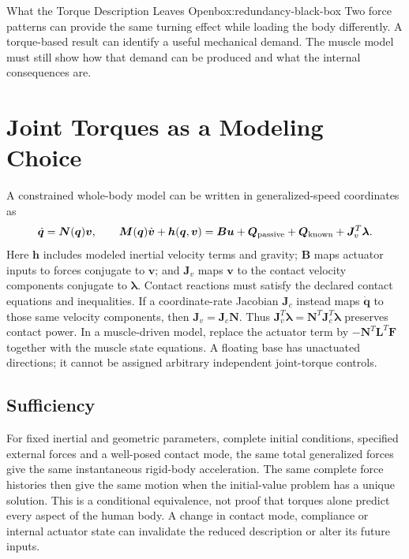 \begin{laymansbox}{What the Torque Description Leaves Open}{box:redundancy-black-box}
Two force patterns can provide the same turning effect while loading the body differently. A torque-based result can identify a useful mechanical demand. The muscle model must still show how that demand can be produced and what the internal consequences are.
\end{laymansbox}

\section{Joint Torques as a Modeling Choice}
\label{sec:why-joint-torques}

A constrained whole-body model can be written in generalized-speed coordinates as
\[
\dot{\bm q}=\bm N(\bm q)\bm v,\qquad
\bm M(\bm q)\dot{\bm v}+\bm h(\bm q,\bm v)
=\bm B\bm u+\bm Q_{\rm passive}
+\bm Q_{\rm known}+\bm J_v^T\bm\lambda.
\]
Here $\bm h$ includes modeled inertial velocity terms and gravity; $\bm B$ maps actuator inputs to forces conjugate to $\bm v$; and $\bm J_v$ maps $\bm v$ to the contact velocity components conjugate to $\bm\lambda$. Contact reactions must satisfy the declared contact equations and inequalities. If a coordinate-rate Jacobian $\bm J_c$ instead maps $\dot{\bm q}$ to those same velocity components, then $\bm J_v=\bm J_c\bm N$. Thus $\bm J_v^T\bm\lambda=\bm N^T\bm J_c^T\bm\lambda$ preserves contact power. In a muscle-driven model, replace the actuator term by $-\bm N^T\bm L^T\bm F$ together with the muscle state equations. A floating base has unactuated directions; it cannot be assigned arbitrary independent joint-torque controls.

\subsection{Sufficiency}

For fixed inertial and geometric parameters, complete initial conditions, specified external forces and a well-posed contact mode, the same total generalized forces give the same instantaneous rigid-body acceleration. The same complete force histories then give the same motion when the initial-value problem has a unique solution. This is a conditional equivalence, not proof that torques alone predict every aspect of the human body. A change in contact mode, compliance or internal actuator state can invalidate the reduced description or alter its future inputs.

